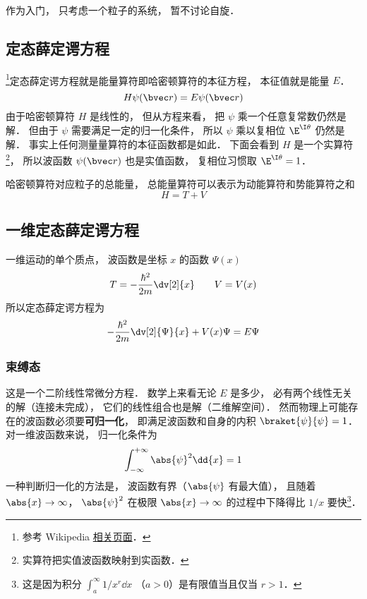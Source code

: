 
\begin{issues}
\issueTODO
\end{issues}


作为入门， 只考虑一个粒子的系统， 暂不讨论自旋．

\subsection{定态薛定谔方程}
\footnote{参考 Wikipedia \href{https://en.wikipedia.org/wiki/Finite_potential_well}{相关页面}．}定态薛定谔方程就是能量算符即哈密顿算符的本征方程， 本征值就是能量 $E$．
\begin{equation}
H \psi(\bvec r) = E \psi(\bvec r)
\end{equation}
由于哈密顿算符 $H$ 是线性的， 但从方程来看， 把 $\psi$ 乘一个任意复常数仍然是解． 但由于 $\psi$ 需要满足一定的归一化条件， 所以 $\psi$ 乘以复相位 $\E^{\I\theta}$ 仍然是解． 事实上任何测量量算符的本征函数都是如此． 下面会看到 $H$ 是一个实算符\footnote{实算符把实值波函数映射到实函数．}， 所以波函数 $\psi(\bvec r)$ 也是实值函数， 复相位习惯取 $\E^{\I\theta} = 1$．

哈密顿算符对应粒子的总能量， 总能量算符可以表示为动能算符和势能算符之和
\begin{equation}
H = T + V
\end{equation}

\subsection{一维定态薛定谔方程}
一维运动的单个质点， 波函数是坐标 $x$ 的函数 $\Psi(x)$
\begin{equation}
T = -\frac{\hbar^2}{2m} \dv[2]{x} \qquad V = V(x)
\end{equation}
所以定态薛定谔方程为
\begin{equation}\label{SchEq_eq1}
-\frac{\hbar^2}{2m} \dv[2]{\Psi}{x} + V(x)\Psi = E \Psi
\end{equation}

\subsubsection{束缚态}
这是一个二阶线性常微分方程． 数学上来看无论 $E$ 是多少， 必有两个线性无关的解（连接未完成）， 它们的线性组合也是解（二维解空间）． 然而物理上可能存在的波函数必须要\textbf{可归一化}， 即满足波函数和自身的内积 $\braket{\psi}{\psi} = 1$． 对一维波函数来说， 归一化条件为
\begin{equation}
\int_{-\infty}^{+\infty} \abs{\psi}^2 \dd{x} = 1
\end{equation}
一种判断归一化的方法是， 波函数有界（$\abs{\psi}$ 有最大值）， 且随着 $\abs{x} \to \infty$，  $\abs{\psi}^2$ 在极限 $\abs{x}\to\infty$ 的过程中下降得比 $1/x$ 要快\footnote{这是因为积分 $\int_a^\infty 1/x^r \dd{x}$ （$a > 0$）是有限值当且仅当 $r > 1$．}．

